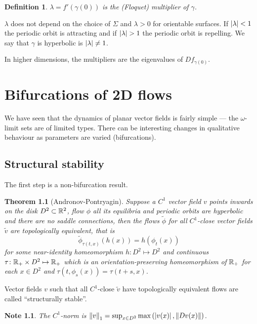 \documentclass{notes}
\theoremstyle{plain}
\newtheorem*{theorem}{Theorem}
\newtheorem*{definition}{Definition}
\newtheorem*{note}{Note}
\begin{document}
\begin{definition}
$\lambda = f'(\gamma(0))$ is the (Floquet) multiplier of $\gamma$.
\end{definition}

$\lambda$ does not depend on the choice of $\Sigma$ and $\lambda > 0$ for
orientable surfaces.  If $\left|\lambda\right| < 1$ the periodic orbit
is attracting and if $\left|\lambda\right| > 1$ the periodic orbit is repelling.
We say that $\gamma$ is hyperbolic is $\left|\lambda\right| \neq 1$.

In higher dimensions, the multipliers are the eigenvalues of $Df_{\gamma(0)}$.

\chapter{Bifurcations of 2D flows}

We have seen that the dynamics of planar vector fields is fairly simple ---
the $\omega$-limit sets are of limited types.  There can be interesting changes
in qualitative behaviour as parameters are varied (bifurcations).

\section{Structural stability}

The first step is a non-bifurcation result.

\begin{theorem}[Andronov-Pontryagin]
Suppose a $C^1$ vector field $v$ points inwards on the disk
$D^2 \subset \mathbb{R}^2$, flow $\phi$ all its equilibria and periodic orbits
are hyperbolic and there are no saddle connections, then the flows
$\tilde{\phi}$ for all $C^1$-close vector fields $\tilde{v}$ are topologically
equivalent, that is
\[
\tilde{\phi}_{\tau(t,x)}(h(x)) = h(\phi_t(x))
\]
for some near-identity homeomorphism $h \colon D^2 \mapsto D^2$ and
continuous $\tau \colon \mathbb{R}_+ \times D^2 \mapsto \mathbb{R}_+$ which is
an orientation-preserving homeomorphism of $\mathbb{R}_+$ for each $x \in D^2$
and $\tau(t,\phi_s(x)) = \tau(t+s,x)$.
\end{theorem}

Vector fields $v$ such that all $C^1$-close $\tilde{v}$ have topologically
equivalent flows are called ``structurally stable''.

\begin{note}
The $C^1$-norm is $\left\|v\right\|_1 = \sup_{x \in D^2} \max \left( \left|v(x)\right|,
\left\|Dv(x)\right\|\right)$.
\end{note}
\end{document}
